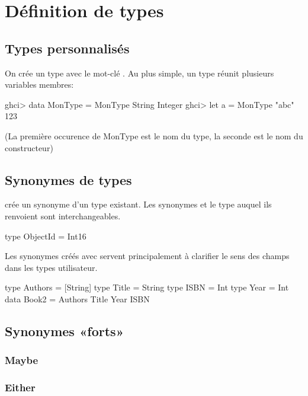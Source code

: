 \section{Définition de types}

\subsection{Types personnalisés}

On crée un type avec le mot-clé . Au plus simple, un type réunit plusieurs variables membres:

\begin{haskellcode}
ghci> data MonType = MonType String Integer
ghci> let a = MonType "abc" 123
\end{haskellcode}
(La première occurence de MonType est le nom du type, la seconde est le nom du constructeur)

\subsection{Synonymes de types}

 crée un synonyme d'un type existant. Les synonymes et le type auquel ils
renvoient sont interchangeables.

\begin{haskellcode}
type ObjectId = Int16
\end{haskellcode}

Les synonymes créés avec  servent principalement à clarifier le sens des champs dans les types utilisateur.

\begin{haskellcode}
type Authors = [String]
type Title = String
type ISBN = Int
type Year = Int
data Book2 = Authors Title Year ISBN
\end{haskellcode}

\subsection{Synonymes «forts»}

\subsubsection{Maybe}

\subsubsection{Either}
